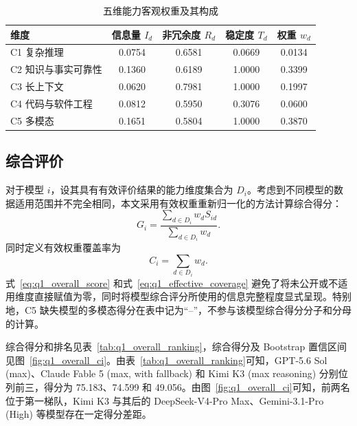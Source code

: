 \begin{table}[htbp]
\centering
\caption{五维能力客观权重及其构成}
\label{tab:q1_weights}
\begin{tabular}{lcccc}
\toprule
维度 & 信息量 \(I_d\) & 非冗余度 \(R_d\) & 稳定度 \(T_d\) & 权重 \(w_d\) \\
\midrule
C1 复杂推理 & 0.0754 & 0.6581 & 0.0669 & 0.0134 \\
C2 知识与事实可靠性 & 0.1360 & 0.6189 & 1.0000 & 0.3399 \\
C3 长上下文 & 0.0620 & 0.7981 & 1.0000 & 0.1997 \\
C4 代码与软件工程 & 0.0812 & 0.5950 & 0.3076 & 0.0600 \\
C5 多模态 & 0.1651 & 0.5804 & 1.0000 & 0.3870 \\
\bottomrule
\end{tabular}
\end{table}

\subsection{综合评价}

对于模型 \(i\)，设其具有有效评价结果的能力维度集合为 \(D_i\)。考虑到不同模型的数据适用范围并不完全相同，本文采用有效权重重新归一化的方法计算综合得分：
\begin{equation}
G_i
=
\frac{
\sum_{d\in D_i}w_dS_{id}
}{
\sum_{d\in D_i}w_d
}.
\label{eq:q1_overall_score}
\end{equation}
同时定义有效权重覆盖率为
\begin{equation}
C_i
=
\sum_{d\in D_i}w_d.
\label{eq:q1_effective_coverage}
\end{equation}
式~\eqref{eq:q1_overall_score} 和式~\eqref{eq:q1_effective_coverage} 避免了将未公开或不适用维度直接赋值为零，同时将模型综合评分所使用的信息完整程度显式呈现。特别地，C5 缺失模型的多模态得分在表中记为“--”，不参与该模型综合得分分子和分母的计算。

综合得分和排名见表~\ref{tab:q1_overall_ranking}，综合得分及 Bootstrap 置信区间见图~\ref{fig:q1_overall_ci}。由表~\ref{tab:q1_overall_ranking}可知，GPT-5.6 Sol (max)、Claude Fable 5 (max, with fallback) 和 Kimi K3 (max reasoning) 分别位列前三，得分为 75.183、74.599 和 49.056。由图~\ref{fig:q1_overall_ci}可知，前两名位于第一梯队，Kimi K3 与其后的 DeepSeek-V4-Pro Max、Gemini-3.1-Pro (High) 等模型存在一定得分差距。

